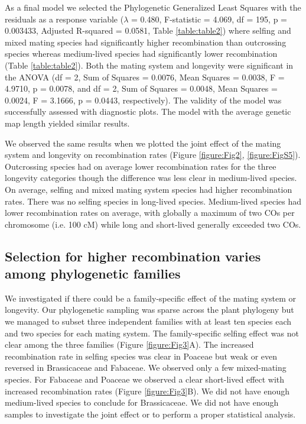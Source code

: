 \documentclass{article}
\begin{document}
As a final model we selected the Phylogenetic Generalized Least Squares with the residuals as a response variable ($\lambda$ = 0.480, F-statistic = 4.069, df = 195, p = 0.003433, Adjusted R-squared = 0.0581, Table \ref{table:table2}) where selfing and mixed mating species had significantly higher recombination than outcrossing species whereas medium-lived species had significantly lower recombination (Table \ref{table:table2}). Both the mating system and longevity were significant in the ANOVA (df = 2, Sum of Squares = 0.0076, Mean Squares = 0.0038, F = 4.9710, p = 0.0078, and df = 2, Sum of Squares = 0.0048, Mean Squares = 0.0024, F = 3.1666, p = 0.0443, respectively). The validity of the model was successfully assessed with diagnostic plots. The model with the average genetic map length yielded similar results.


We observed the same results when we plotted the joint effect of the mating system and longevity on recombination rates (Figure \ref{figure:Fig2}, \ref{figure:FigS5}). Outcrossing species had on average lower recombination rates for the three longevity categories though the difference was less clear in medium-lived species. On average, selfing and mixed mating system species had higher recombination rates. There was no selfing species in long-lived species. Medium-lived species had lower recombination rates on average, with globally a maximum of two COs per chromosome (i.e. 100 cM) while long and short-lived generally exceeded two COs.


\subsection*{Selection for higher recombination varies among phylogenetic families}


We investigated if there could be a family-specific effect of the mating system or longevity. Our phylogenetic sampling was sparse across the plant phylogeny but we managed to subset three independent families with at least ten species each and two species for each mating system. The family-specific selfing effect was not clear among the three families (Figure \ref{figure:Fig3}A). The increased recombination rate in selfing species was clear in Poaceae but weak or even reversed in Brassicaceae and Fabaceae. We observed only a few mixed-mating species. For Fabaceae and Poaceae we observed a clear short-lived effect with increased recombination rates (Figure \ref{figure:Fig3}B). We did not have enough medium-lived species to conclude for Brassicaceae. We did not have enough samples to investigate the joint effect or to perform a proper statistical analysis.
\end{document}

